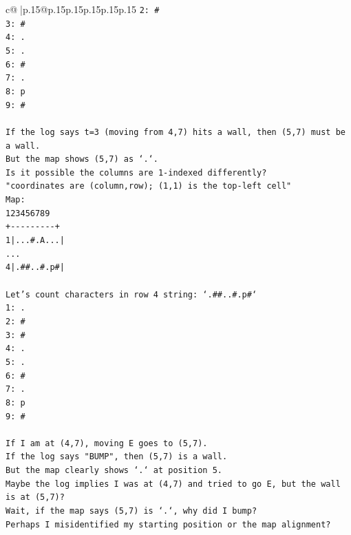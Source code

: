 \documentclass{article}
\begin{document}
{\begin{supertabular}{c@{$\;$}|p{.15\linewidth}@{}p{.15\linewidth}p{.15\linewidth}p{.15\linewidth}p{.15\linewidth}p{.15\linewidth}}
{{{\texttt{2: \#} \\
\texttt{3: \#} \\
\texttt{4: .} \\
\texttt{5: .} \\
\texttt{6: \#} \\
\texttt{7: .} \\
\texttt{8: p} \\
\texttt{9: \#} \\
\\ 
\texttt{If the log says t=3 (moving from 4,7) hits a wall, then (5,7) must be a wall.} \\
\texttt{But the map shows (5,7) as `.`.} \\
\texttt{Is it possible the columns are 1{-}indexed differently?} \\
\texttt{"coordinates are (column,row); (1,1) is the top{-}left cell"} \\
\texttt{Map:} \\
\texttt{123456789} \\
\texttt{+{-}{-}{-}{-}{-}{-}{-}{-}{-}+} \\
\texttt{1|...\#.A...|} \\
\texttt{...} \\
\texttt{4|.\#\#..\#.p\#|} \\
\\ 
\texttt{Let's count characters in row 4 string: `.\#\#..\#.p\#`} \\
\texttt{1: .} \\
\texttt{2: \#} \\
\texttt{3: \#} \\
\texttt{4: .} \\
\texttt{5: .} \\
\texttt{6: \#} \\
\texttt{7: .} \\
\texttt{8: p} \\
\texttt{9: \#} \\
\\ 
\texttt{If I am at (4,7), moving E goes to (5,7).} \\
\texttt{If the log says "BUMP", then (5,7) is a wall.} \\
\texttt{But the map clearly shows `.` at position 5.} \\
\texttt{Maybe the log implies I was at (4,7) and tried to go E, but the wall is at (5,7)?} \\
\texttt{Wait, if the map says (5,7) is `.`, why did I bump?} \\
\texttt{Perhaps I misidentified my starting position or the map alignment?} \\
}}}
\end{supertabular}}
\end{document}
